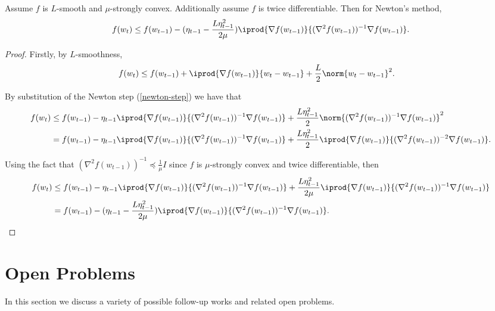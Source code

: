\documentclass[10pt]{article} %
\begin{document}
\begin{lemma}
\label{lem:newton-descent}
    Assume $f$ is $L$-smooth and $\mu$-strongly convex. Additionally assume $f$ is twice differentiable. Then for Newton's method,
    $$f(w_{t}) \leq f(w_{t-1}) - (\eta_{t-1} - \frac{L\eta_{t-1}^2}{2\mu}) \iprod{\nabla f(w_{t-1})}{(\nabla^2 f(w_{t-1}))^{-1} \nabla f(w_{t-1})}.$$
\end{lemma}
\begin{proof}
   Firstly, by $L$-smoothness,
    \begin{align*}
        f(w_{t}) 
        &\leq f(w_{t-1}) + \iprod{\nabla f(w_{t-1})}{w_{t} - w_{t-1}} + \frac{L}{2}\norm{w_{t} - w_{t-1}}^2.
    \end{align*}
    
    By substitution of the Newton step (\ref{newton-step}) we have that
    \begin{align*}
        f(w_{t}) 
        &\leq f(w_{t-1}) - \eta_{t-1}\iprod{\nabla f(w_{t-1})}{(\nabla^2 f(w_{t-1}))^{-1} \nabla f(w_{t-1})} + \frac{L\eta_{t-1}^2}{2}\norm{(\nabla^2 f(w_{t-1}))^{-1} \nabla f(w_{t-1})}^2 \\
        &= f(w_{t-1}) - \eta_{t-1}\iprod{\nabla f(w_{t-1})}{(\nabla^2 f(w_{t-1}))^{-1} \nabla f(w_{t-1})} + \frac{L\eta_{t-1}^2}{2} \iprod{\nabla f(w_{t-1})}{(\nabla^2 f(w_{t-1}))^{-2} \nabla f(w_{t-1})}.
    \end{align*}

    Using the fact that $(\nabla^2 f(w_{t-1}))^{-1} \preceq \frac{1}{\mu}I$ since $f$ is $\mu$-strongly convex and twice differentiable, then
    \begin{align*}
        f(w_{t}) 
        &\leq f(w_{t-1}) - \eta_{t-1}\iprod{\nabla f(w_{t-1})}{(\nabla^2 f(w_{t-1}))^{-1} \nabla f(w_{t-1})} + \frac{L\eta_{t-1}^2}{2\mu} \iprod{\nabla f(w_{t-1})}{(\nabla^2 f(w_{t-1}))^{-1} \nabla f(w_{t-1})} \\
        &= f(w_{t-1}) - (\eta_{t-1} - \frac{L\eta_{t-1}^2}{2\mu}) \iprod{\nabla f(w_{t-1})}{(\nabla^2 f(w_{t-1}))^{-1} \nabla f(w_{t-1})}.
    \end{align*}
\end{proof}
\fi

\section{Open Problems}\label{open-problems}
In this section we discuss a variety of possible follow-up works and related open problems.
\end{document}
